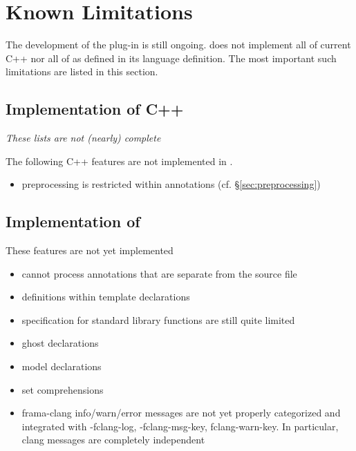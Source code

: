\chapter{Known Limitations}

The development of the \fclang plug-in is still ongoing.
\fclang does not implement all of current C++ nor all of 
\acslpp as defined in its language definition\cite{acslpp}.
The most important such limitations are listed in this section.

\section{Implementation of C++}

\textit{These lists are not (nearly) complete}

The following C++ features are not implemented in \acslpp.
\begin{itemize}
\item preprocessing is restricted within \acslpp annotations (cf. \S\ref{sec:preprocessing})
\end{itemize}

\section{Implementation of \acslpp}

These \acslpp features are not yet implemented
\begin{itemize}

\item \fclang cannot process annotations that are separate from the source file
\item \acslpp definitions within template declarations
\item \acslpp specification for standard \cpp library functions are still quite limited
\item ghost declarations
\item model declarations
\item set comprehensions
\item frama-clang info/warn/error messages are not yet properly categorized and integrated with -fclang-log, -fclang-msg-key, fclang-warn-key. In particular, clang messages are completely independent

\end{itemize}

